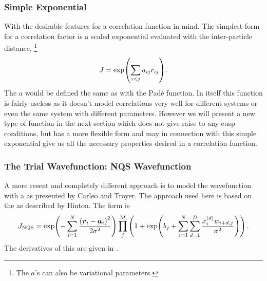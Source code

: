     \subsubsection{Simple Exponential}
        With the desirable features for a correlation function in mind. The
        simplest form for a correlation factor is a scaled exponential
        evaluated with the inter-particle distance, \footnote{The $a$'s can
        also be variational parameters.}
            \begin{equation}
                J = \exp(\sum\limits_{i<j} a_{ij} r_{ij}).
            \end{equation}
        The $a$ would be defined the same as with the Pad\'e function. In
        itself this function is fairly useless as it doesn't model correlations
        very well for different systems or even the same system with different
        parameters. However we will present a new type of function in the next
        section which does not give raise to any cusp conditions, but has a
        more flexible form and may in connection with this simple exponential
        give us all the necessary properties desired in a correlation function.

    \subsubsection{The Trial Wavefunction: NQS Wavefunction
    \label{sususec:NQSJastrow}}
        A more resent and completely different approach is to model the
        wavefunction with a  as presented by Carleo and
        Troyer\cite{CarleoANN}. The approach used here is based on the
         as described by
        Hinton\cite{RBMpractical}. The form is
            \begin{equation}
                J_{\text{NQS}} = \exp(-\suml{i=1}{N} \frac{\left(\blds{r}_i -
                \blds{a}_i\right)^2}{2\sigma^2})\prod\limits^{M}_j \left(1 +
                \exp(b_j + \suml{i=1}{N}\suml{d=1}{D}
                \frac{x^{(d)}_iw_{i+d,j}}{\sigma^2})\right).
                \label{eq:nqsdef}
            \end{equation}
        The derivatives of this are given in .

